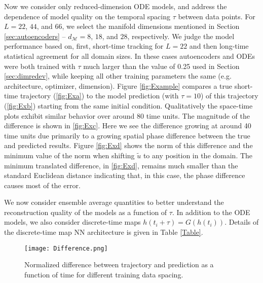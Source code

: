 \documentclass[preprint,aps,pre,letterpaper,onecolumn,superscriptaddress]{revtex4-2} %
\newcommand{\IM}{\mathcal{M}}
\begin{document}
Now we consider only reduced-dimension ODE models, and address the dependence of model quality on the temporal spacing $\tau$ between data points. For $L=22$, $44$, and $66$, we select the manifold dimensions mentioned in Section \ref{sec:autoencoders} -- $d_\IM=8$, $18$, and $28$, respectively. We judge the model performance based on, first, short-time tracking for $L=22$ and then long-time statistical agreement for all domain sizes. In these cases autoencoders and ODEs were both trained with $\tau$ much larger than the value of 0.25 used in Section \ref{sec:dimredev}, while keeping all other training parameters the same (e.g. architecture, optimizer, dimension). Figure \ref{fig:Example} compares a true short-time trajectory (\ref{fig:Exa}) to the model prediction (with $\tau=10$) of this trajectory (\ref{fig:Exb}) starting from the same initial condition. Qualitatively the space-time plots exhibit similar behavior over around 80 time units. The magnitude of the difference is shown in \ref{fig:Exc}. Here we see the difference growing at around 40 time units due primarily to a growing spatial phase difference between the true and predicted results. Figure \ref{fig:Exd} shows the norm of this difference and the minimum value of the norm when shifting $\tilde{u}$ to any position in the domain. The minimum translated difference, in \ref{fig:Exd}, remains much smaller than the standard Euclidean distance indicating that, in this case, the phase difference causes most of the error.

We now consider ensemble average quantities to better understand the reconstruction quality of the models as a function of $\tau$. In addition to the ODE models, we also consider discrete-time maps $h(t_i+\tau)=G(h(t_i))$. 
 Details of the discrete-time map NN architecture is given in Table \ref{Table}. 

\begin{figure} 
	\texttt{[image: Difference.png]}
	\caption{Normalized difference between trajectory and prediction as a function of time for different training data spacing.}
	\label{fig:Difference}
\end{figure} 
\end{document}
